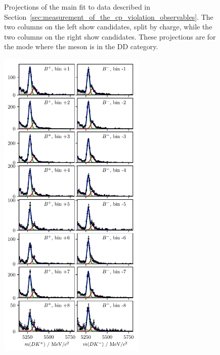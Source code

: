 \begin{figure}[tp]
    \caption{Projections of the main fit to data described in Section~\ref{sec:measurement_of_the_cp_violation_observables}. The two columns on the left show \BtoDK candidates, split by charge, while the two columns on the right show \BtoDpi candidates. These projections are for the \DtoKspp mode where the \KS meson is in the DD category.}
\end{figure}

\begin{figure}[tp]
    \centering
    \includegraphics[height=6in]{figures/analysis/bin_by_bin/pretty_fit_bins_dk_DD_2.pdf}

\end{figure}
